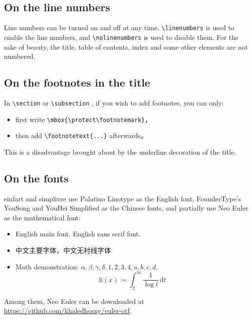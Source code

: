 \documentclass{einfart}
\providecommand{\einfart}{\textsf{einfart}}
\providecommand{\simplivre}{\textsf{simplivre}}
\begin{document}

\subsection{On the line numbers}
Line numbers can be turned on and off at any time. \lstinline|\linenumbers| is used to enable the line numbers, and \lstinline|\nolinenumbers| is used to disable them. For the sake of beauty, the title, table of contents, index and some other elements are not numbered.

\subsection{On the footnotes in the title}
In \lstinline|\section| or \lstinline|\subsection| , if you wish to add footnotes, you can only:
\begin{itemize}
    \item first write \lstinline|\mbox{\protect\footnotemark}|，
    \item then add \lstinline|\footnotetext{...}| afterwards。
\end{itemize}
This is a disadvantage brought about by the underline decoration of the title.

\subsection{On the fonts}
\einfart{} and \simplivre{} use Palatino Linotype as the English font, FounderType's YouSong and YouHei Simplified as the Chinese fonts, and partially use Neo Euler as the mathematical font:
\begin{itemize}
    \item English main font. \textsf{English sans serif font}.
    \item 中文主要字体，\textsf{中文无衬线字体}
    \item Math demonstration: \( \alpha, \beta, \gamma, \delta, 1,2,3,4, a,b,c,d \), \[\mathrm{li}(x)\coloneqq \int_2^{\infty} \frac{1}{\log t}\,\mathrm{d}t \]
\end{itemize}

Among them, Neo Euler can be downloaded at \url{https://github.com/khaledhosny/euler-otf}.
\end{document}
